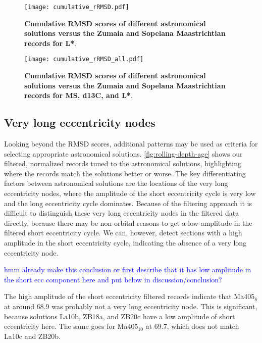 \documentclass[draft]{agujournal2019}
\newcommand{\ijk}{\textcolor{blue}}
\begin{document}
\setcounter{figure}{3000}
\begin{figure}[htb]
  \centering
  \texttt{[image: cumulative\_rRMSD.pdf]}
  \caption{\label{fig:cum-RMSD}
    \textbf{Cumulative \gls{RMSD} scores of different astronomical solutions versus the Zumaia and Sopelana Maastrichtian records for \gls{L*}}.
}
\end{figure}

\setcounter{figure}{3001}
\begin{figure}[htb]
  \centering
  \texttt{[image: cumulative\_rRMSD\_all.pdf]}
  \caption{\label{fig:cum-RMSD-all}
    \textbf{Cumulative \gls{RMSD} scores of different astronomical solutions versus the Zumaia and Sopelana Maastrichtian records for \gls{MS}, \gls{d13C}, and \gls{L*}}.
}
\end{figure}

\subsection{Very long eccentricity nodes}

Looking beyond the \gls{RMSD} scores, additional patterns may be used as criteria for selecting appropriate astronomical solutions.
\cref{fig:rolling-depth-age} shows our filtered, normalized records tuned to the astronomical solutions, highlighting where the records match the solutions better or worse.
The key differentiating factors between astronomical solutions are the locations of the very long eccentricity nodes, where the amplitude of the short eccentricity cycle is very low and the long eccentricity cycle dominates.
Because of the filtering approach it is difficult to distinguish these very long eccentricity nodes in the filtered data directly, because there may be non-orbital reasons to get a low-amplitude in the filtered short eccentricity cycle.
We can, however, detect sections with a high amplitude in the short eccentricity cycle, indicating the absence of a very long eccentricity node.

\ijk{hmm already make this conclusion or first describe that it has low amplitude in the short ecc component here and put below in discussion/conclusion?}

The high amplitude of the short eccentricity filtered records indicate that Ma405\(_{8}\) at around \qty{68.9}{\millionyearago} was probably not a very long eccentricity node.
This is significant, because solutions La10b, ZB18a, and ZB20c have a low amplitude of short eccentricity here.
The same goes for Ma405\(_{10}\) at \qty{69.7}{\millionyearago}, which does not match La10c and ZB20b.
\end{document}
